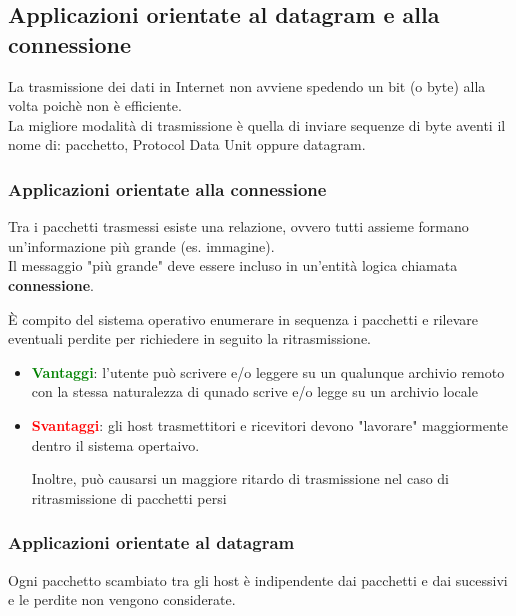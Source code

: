 \documentclass[12pt, a4paper, oneside]{book}
\begin{document}
    \subsection{Applicazioni orientate al datagram e alla connessione}
    La trasmissione dei dati in Internet non avviene spedendo un bit (o byte) alla volta poichè non è efficiente.\\[0.2ex]
    La migliore modalità di trasmissione è quella di inviare sequenze di byte aventi il nome di: pacchetto, Protocol Data Unit oppure datagram.

    \subsubsection{Applicazioni orientate alla connessione}
    Tra i pacchetti trasmessi esiste una relazione, ovvero tutti assieme formano un'informazione più grande (es. immagine).\\[0.2ex]
    Il messaggio "più grande" deve essere incluso in un'entità logica chiamata \textcolor{azzurrino}{\textbf{connessione}}.

    È compito del sistema operativo enumerare in sequenza i pacchetti e rilevare eventuali perdite per richiedere in seguito la ritrasmissione.
    \begin{itemize}[label=$\Rightarrow$]
      \item \textcolor{green}{\textbf{Vantaggi}}: l'utente può scrivere e/o leggere su un qualunque archivio remoto con la stessa naturalezza di qunado scrive e/o legge su un archivio locale
      \smallskip
      \item \textcolor{red}{\textbf{Svantaggi}}: gli host trasmettitori e ricevitori devono "lavorare" maggiormente dentro il sistema opertaivo.
      
      Inoltre, può causarsi un maggiore ritardo di trasmissione nel caso di ritrasmissione di pacchetti persi
    \end{itemize}

    \subsubsection{Applicazioni orientate al datagram}
    Ogni pacchetto scambiato tra gli host è indipendente dai pacchetti e dai sucessivi e le perdite non vengono considerate.

\end{document}
